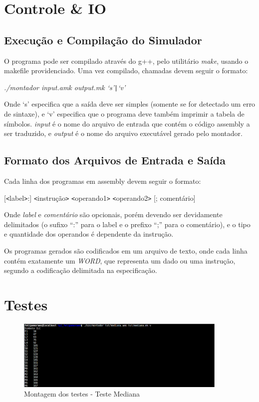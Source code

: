\documentclass[12pt, a4paper]{article}
\begin{document}
\section{Controle \& IO}

\subsection{Execução e Compilação do Simulador}

O programa pode ser compilado através do g++, pelo utilitário \emph{make}, usando o makefile providenciado. Uma vez compilado, chamadas devem seguir o formato:

\begin{center}
\emph{./montador input.amk output.mk `s'{\tt{|}}`v'}
\end{center}

Onde `s' especifica que a saída deve ser simples (somente se for detectado um erro de sintaxe), e `v' especifica que o programa deve também imprimir a tabela de símbolos. \emph{input} é o nome do arquivo de entrada que contém o código assembly a ser traduzido, e \emph{output} é o nome do arquivo executável gerado pelo montador.

\subsection{Formato dos Arquivos de Entrada e Saída}

Cada linha dos programas em assembly devem seguir o formato:

\begin{center}
[{\tt<}label{\tt>}:] {\tt<}instrução{\tt>} {\tt<}operando1{\tt>} {\tt<}operando2{\tt>} [; comentário]
\end{center}

Onde \emph{label} e \emph{comentário} são opcionais, porém devendo ser devidamente delimitados (o sufixo ``:'' para o label e o prefixo ``;'' para o comentário), e o tipo e quantidade dos operandos é dependente da instrução.

Os programas gerados são codificados em um arquivo de texto, onde cada linha contém exatamente um \emph{WORD}, que representa um dado ou uma instrução, segundo a codificação delimitada na especificação.

\section{Testes}

\begin{figure}
\centering
\includegraphics[width=0.9\textwidth]{RuntimeScreencap1.png}
\caption{Montagem dos testes - Teste Mediana}
\label{FigureExecution1}
\end{figure}
\end{document}
